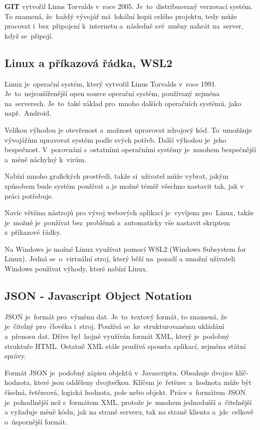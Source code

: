 \documentclass[14pt,a4paper]{article}
\begin{document}
        \textbf{GIT} vytvořil Linus Torvalds v~roce 2005. Je~to~distribuovaný verzovací systém. To znamená, že~každý vývojář má~lokální kopii celého projektu,
        tedy může pracovat i~bez~připojení k~internetu a~následně své~změny nahrát na~server, když se~připojí.

        \subsection{Linux a příkazová řádka, WSL2}
        Linux je~operační systém, který vytvořil Linus Torvalds v~roce 1991. Je~to~nejrozšířenější open source operační systém,
        používaný zejména na~serverech. Je~to~také základ pro~mnoho dalších operačních systémů, jako např.~Android.
        
        Velikou výhodou je otevřenost a~možnost upravovat zdrojový kód. To~umožňuje vývojářům upravovat systém podle svých potřeb.
        Další výhodou je~jeho bezpečnost. V~porovnání s~ostatními operačními systémy je~mnohem bezpečnější a~méně náchylný k~virům.

        Nabízí mnoho grafických prostředí, takže si~uživatel může vybrat, jakým způsobem bude systém používat a je možné téměř
        všechno nastavit tak, jak v práci potřebuje.

        Navíc většina nástrojů pro vývoj webových aplikací je~vyvíjena pro~Linux, takže je~možné je~používat bez~problémů a~automaticky
        vše nastavit skriptem z~příkazové řádky.

        Na Windows je možné Linux využívat pomocí WSL2 (Windows Subsystem for Linux). Jedná se~o~virtuální stroj, který běží na~pozadí
        a umožní uživateli Windows používat výhody, které nabízí Linux.

        \subsection{JSON - Javascript Object Notation}
        JSON je~formát pro~výměnu dat. Je~to~textový formát, to znamená, že je~čitelný pro~člověka i~stroj.
        Používá se~ke~strukturovanému ukládání a~přenosu dat. Dříve byl~hojně využíván formát XML,
        který je~podobný struktuře HTML. Ostatně XML stále používá spousta aplikací, zejména státní správy.

        Formát JSON je~podobný zápisu objektů v~Javascriptu. Obsahuje dvojice klíč-hodnota, které jsou odděleny dvojtečkou.
        Klíčem je~řetězec a~hodnota může být číselná, řetězcová, logická hodnota, pole nebo objekt.
        Práce s~formátem JSON je~pohodlnější než s~formátem XML, protože je~mnohem jednodušší a~čitelnější a vyžaduje méně kódu,
        jak na straně serveru, tak na straně klienta a~jde~celkově o~úspornější formát.
\end{document}
